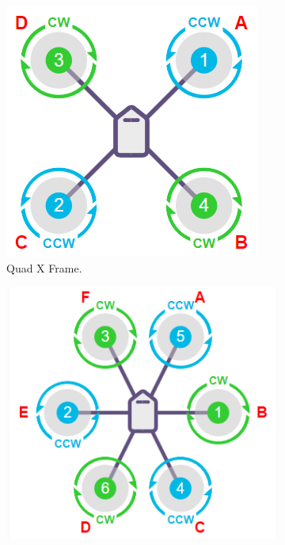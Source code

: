     \begin{figure}[H]
        \centering
        \begin{subfigure}[b]{0.4\textwidth}
            \includegraphics[width=\textwidth]{pictures/quad_frame.png}
            \caption{Quad X Frame.}
            \label{fig:quad_frame}
        \end{subfigure}
        \hfill
        \begin{subfigure}[b]{0.4\textwidth}
            \includegraphics[width=\textwidth]{pictures/hexa_frame.png}

\end{subfigure}
\end{figure}
